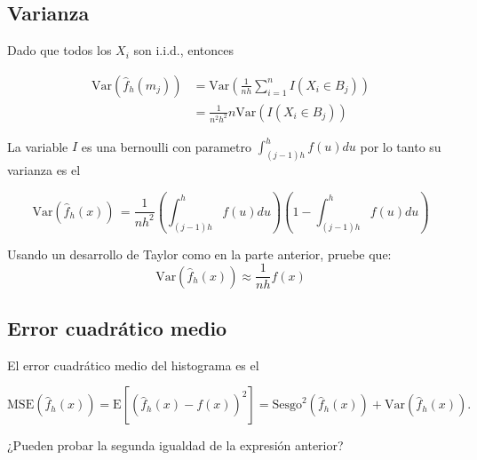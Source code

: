 \documentclass[
  12pt,
]{book}
\theoremstyle{definition}
\theoremstyle{definition}
\theoremstyle{definition}
\theoremstyle{remark}
\let\BeginKnitrBlock\begin \let\EndKnitrBlock\end
\begin{document}
\hypertarget{varianza}{%
\subsection{Varianza}\label{varianza}}

Dado que todos los \(X_i\) son i.i.d., entonces

\begin{align*}
\mathrm{Var}\left( \hat{f}_h(m_j)\right) & =
\mathrm{Var}\left( \frac{1}{nh} \sum_{i = 1}^{n} I(X_i \in B_j)\right)                                  \\
& = \frac{1}{n^2h^2} n\mathrm{Var}\left( I(X_i \in B_j)\right)
\end{align*}

La variable \(I\) es una bernoulli con parametro \(\int_{(j - 1)h}^{h} f(u)du\) por lo tanto su varianza es el

\begin{equation*}
\mathrm{Var}\left( \hat{f}_h(x)\right)\, =
\frac{1}{nh^2} \left(\int_{(j - 1)h}^{h} f(u)du \right)\left( 1 -\int_{(j - 1)h}^{h} f(u)du \right)
\end{equation*}

\BeginKnitrBlock{exercise}
\protect\hypertarget{exr:unnamed-chunk-3}{}{\label{exr:unnamed-chunk-3} }Usando un desarrollo de Taylor como en la parte anterior, pruebe que:
\begin{equation*}
\mathrm{Var}\left( \hat{f}_h(x)\right)\approx
\frac{1}{nh} f(x)
\end{equation*}
\EndKnitrBlock{exercise}

\hypertarget{error-cuadruxe1tico-medio}{%
\subsection{Error cuadrático medio}\label{error-cuadruxe1tico-medio}}

El error cuadrático medio del histograma es el

\begin{equation*}
\mathrm{MSE}\left( \hat{f}_h(x)\right) =
\mathrm{E}\left[\left(\hat{f}_h(x) - f(x)\right)^2\right] = \mathrm{Sesgo}^2\left( \hat{f}_h(x)\right) + \mathrm{Var}\left( \hat{f}_h(x)\right).
\end{equation*}

\BeginKnitrBlock{exercise}
\protect\hypertarget{exr:unnamed-chunk-4}{}{\label{exr:unnamed-chunk-4} }¿Pueden probar la segunda igualdad de la expresión anterior?
\EndKnitrBlock{exercise}
\end{document}
